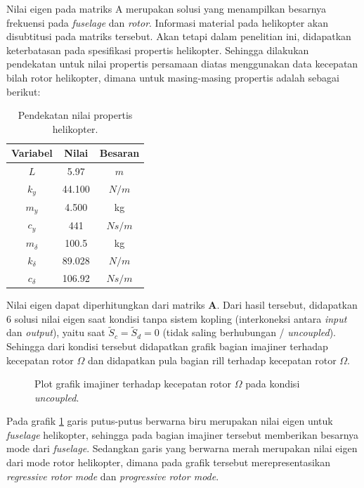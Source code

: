Nilai eigen pada matriks A merupakan solusi yang menampilkan besarnya frekuensi pada \textit{fuselage} dan \textit{rotor}. Informasi material pada helikopter akan disubtitusi pada matriks tersebut. Akan tetapi dalam penelitian ini, didapatkan keterbatasan pada spesifikasi propertis helikopter. Sehingga dilakukan pendekatan untuk nilai propertis persamaan diatas menggunakan data kecepatan bilah rotor helikopter, dimana untuk masing-masing propertis adalah sebagai berikut:

\begin{table}[h]
	\centering
	\caption{Pendekatan nilai propertis helikopter.}
	\label{tb:propertis}
	\begin{tabular}{|c|c|c|}
		\hline
		Variabel     & Nilai  	& Besaran \\ \hline
		$L$          & 5.97  	& $m$     \\ \hline
		$k_y$        & 44.100  	& $N/m$   \\ \hline
		$m_y$        & 4.500   	& kg      \\ \hline
		$c_y$        & 441    	& $Ns/m$  \\ \hline
		$m_{\delta}$ & 100.5  	& kg      \\ \hline
		$k_{\delta}$ & 89.028  	& $N/m$   \\ \hline
		$c_{\delta}$ & 106.92 	& $Ns/m$  \\ \hline
	\end{tabular}
\end{table}

Nilai eigen dapat diperhitungkan dari matriks $\mathbf{A}$. Dari hasil tersebut, didapatkan 6 solusi nilai eigen saat kondisi tanpa sistem kopling (interkoneksi antara \textit{input} dan \textit{output}), yaitu saat $\tilde{S}_c = \tilde{S}_d = 0$ (tidak saling berhubungan / \textit{uncoupled}). Sehingga dari kondisi tersebut didapatkan grafik bagian imajiner terhadap kecepatan rotor $\Omega$ dan didapatkan pula bagian rill terhadap kecepatan rotor $\Omega$.

\begin{figure}[H]
	\centering
	\caption{Plot grafik imajiner terhadap kecepatan rotor $\Omega$ pada kondisi \textit{uncoupled}.}
	\label{fig:imag(uncoupled)}
\end{figure}

Pada grafik \ref{fig:imag(uncoupled)} garis putus-putus berwarna biru merupakan nilai eigen untuk \textit{fuselage} helikopter, sehingga pada bagian imajiner tersebut memberikan besarnya mode dari \textit{fuselage}. Sedangkan garis yang berwarna merah merupakan nilai eigen dari mode rotor helikopter, dimana pada grafik tersebut merepresentasikan \textit{regressive rotor mode} dan \textit{progressive rotor mode}. 

